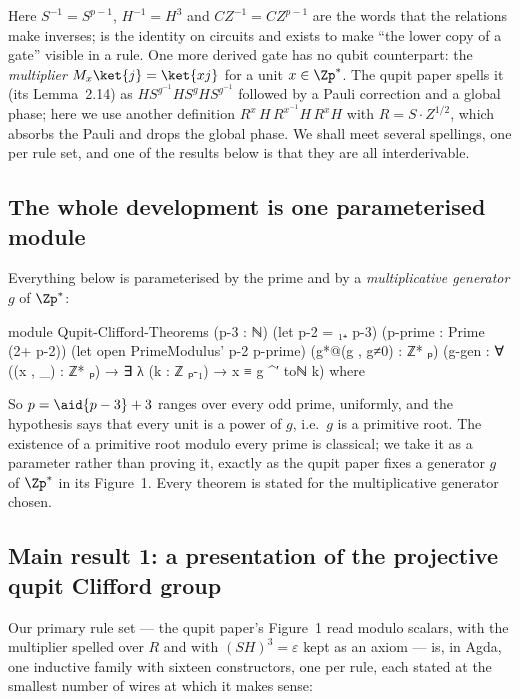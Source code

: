 Here $S^{-1} = S^{p-1}$, $H^{-1} = H^{3}$ and $CZ^{-1} = CZ^{p-1}$ are
the words that the relations make inverses;  is the
identity on circuits and exists to make ``the lower copy of a gate''
visible in a rule.  One more derived gate has no qubit counterpart:
the \emph{multiplier} $M_x\ket{j} = \ket{xj}$ for a unit $x \in
\Zp^{*}$.  The qupit paper spells it (its Lemma~2.14) as $H S^{g^{-1}}
H S^{g} H S^{g^{-1}}$ followed by a Pauli correction and a global
phase; here we use another definition $R^{x}\,H\,R^{x^{-1}}H\,R^{x}H$
with $R = S\cdot Z^{1/2}$, which absorbs the Pauli and drops the
global phase.  We shall meet several spellings, one per rule set, and
one of the results below is that they are all interderivable.

\subsection{The whole development is one parameterised module}

Everything below is parameterised by the prime and by a
\emph{multiplicative generator} $g$ of $\Zp^{*}$:

\begin{agdacode}
module Qupit-Clifford-Theorems
  (p-3 : ℕ)
  (let p-2 = ₁₊ p-3)
  (p-prime : Prime (2+ p-2))
  (let open PrimeModulus' p-2 p-prime)
  (g*@(g , g≠0) : ℤ* ₚ)
  (g-gen : ∀ ((x , _) : ℤ* ₚ) → ∃ λ (k : ℤ ₚ-₁) → x ≡ g ^′ toℕ k)
  where
\end{agdacode}

So $p = \aid{p-3} + 3$ ranges over every odd prime, uniformly, and the
hypothesis  says that every unit is a power of $g$, i.e.\ $g$
is a primitive root.  The existence of a primitive root modulo every
prime is classical; we take it as a parameter rather than proving it,
exactly as the qupit paper fixes a generator $g$ of $\Zp^{*}$ in its
Figure~1.  Every theorem is stated for the multiplicative generator
chosen.

\subsection{Main result 1: a presentation of the projective qupit Clifford group}

Our primary rule set --- the qupit paper's Figure~1 read modulo
scalars, with the multiplier spelled over $R$ and with $(SH)^3 =
\varepsilon$ kept as an axiom --- is, in Agda, one inductive family
with sixteen constructors, one per rule, each stated at the smallest
number of wires at which it makes sense:


